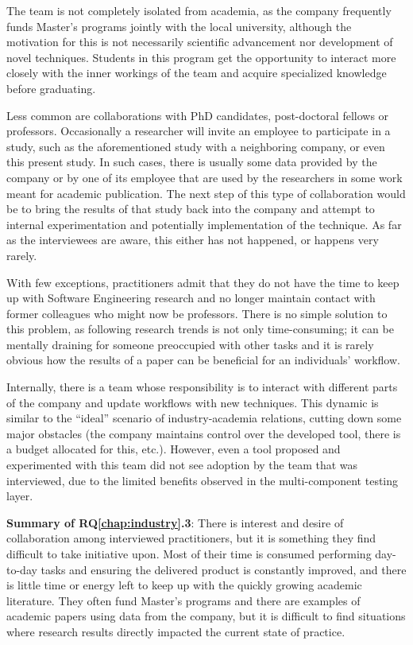 The team is not completely isolated from academia, as the company frequently funds Master's programs jointly with the local university, although the motivation for this is not necessarily scientific advancement nor development of novel techniques.
Students in this program get the opportunity to interact more closely with the inner workings of the team and acquire specialized knowledge before graduating.

Less common are collaborations with PhD candidates, post-doctoral fellows or professors.
Occasionally a researcher will invite an employee to participate in a study, such as the aforementioned study with a neighboring company, or even this present study.
In such cases, there is usually some data provided by the company or by one of its employee that are used by the researchers in some work meant for academic publication.
The next step of this type of collaboration would be to bring the results of that study back into the company and attempt to internal experimentation and potentially implementation of the technique.
As far as the interviewees are aware, this either has not happened, or happens very rarely.

With few exceptions, practitioners admit that they do not have the time to keep up with Software Engineering research and no longer maintain contact with former colleagues who might now be professors.
There is no simple solution to this problem, as following research trends is not only time-consuming; it can be mentally draining for someone preoccupied with other tasks and it is rarely obvious how the results of a paper can be beneficial for an individuals' workflow.

Internally, there is a team whose responsibility is to interact with different parts of the company and update workflows with new techniques.
This dynamic is similar to the ``ideal'' scenario of industry-academia relations, cutting down some major obstacles (the company maintains control over the developed tool, there is a budget allocated for this, etc.).
However, even a tool proposed and experimented with this team did not see adoption by the team that was interviewed, due to the limited benefits observed in the multi-component testing layer.

\begin{tcolorbox}%
\textbf{Summary of RQ\ref{chap:industry}.3}: 
There is interest and desire of collaboration among interviewed practitioners, but it is something they find difficult to take initiative upon.
Most of their time is consumed performing day-to-day tasks and ensuring the delivered product is constantly improved, and there is little time or energy left to keep up with the quickly growing academic literature.
They often fund Master's programs and there are examples of academic papers using data from the company, but it is difficult to find situations where research results directly impacted the current state of practice.
\end{tcolorbox}

